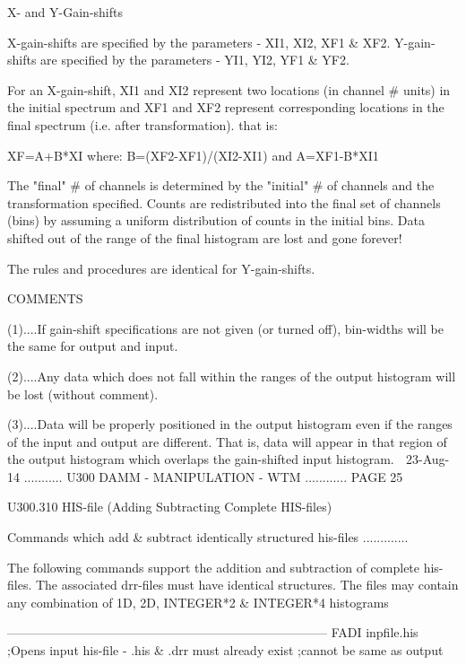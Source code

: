                               X- and Y-Gain-shifts
 
   X-gain-shifts are specified by the parameters - XI1, XI2, XF1 & XF2.
   Y-gain-shifts are specified by the parameters - YI1, YI2, YF1 & YF2.
 
   For an X-gain-shift, XI1 and XI2 represent  two  locations  (in  channel  #
   units)  in  the  initial  spectrum  and XF1 and XF2 represent corresponding
   locations in the final spectrum (i.e. after transformation). that is:
 
            XF=A+B*XI
   where:   B=(XF2-XF1)/(XI2-XI1)
   and      A=XF1-B*XI1
 
   The "final" # of channels is determined by the "initial" # of channels  and
   the  transformation  specified. Counts are redistributed into the final set
   of channels (bins) by assuming a uniform  distribution  of  counts  in  the
   initial  bins.  Data  shifted  out  of the range of the final histogram are
   lost and gone forever!
 
   The rules and procedures are identical for Y-gain-shifts.
 
                                    COMMENTS
 
   (1)....If   gain-shift  specifications  are  not  given  (or  turned  off),
          bin-widths will be the same for output and input.
 
   (2)....Any data which does  not  fall  within  the  ranges  of  the  output
          histogram will be lost (without comment).
 
   (3)....Data  will  be  properly  positioned in the output histogram even if
          the ranges of the input and output  are  different.  That  is,  data
          will  appear  in  that region of the output histogram which overlaps
          the gain-shifted input histogram.
    
   23-Aug-14 ........... U300  DAMM - MANIPULATION - WTM ............ PAGE  25
 
 
   U300.310  HIS-file (Adding Subtracting Complete HIS-files)
 
   Commands which add & subtract identically structured  his-files .............
 
   The following commands support the addition  and  subtraction  of  complete
   his-files.  The  associated  drr-files  must have identical structures. The
   files may  contain  any  combination  of  1D,  2D,  INTEGER*2  &  INTEGER*4
   histograms
 
   -----------------------------------------------------------------------------
   FADI   inpfile.his  ;Opens input  his-file - .his & .drr must already exist
                       ;cannot be same as output
 
